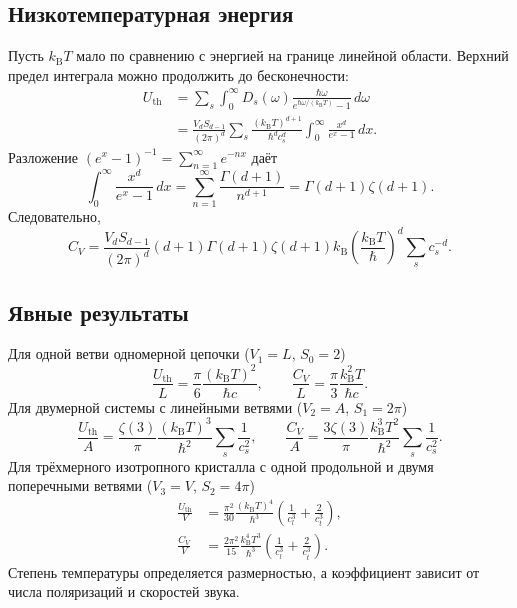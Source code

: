 \documentclass[../final.tex]{subfiles}
\begin{document}
\subsection*{Низкотемпературная энергия}

Пусть $k_{\mathrm B}T$ мало по сравнению с энергией на границе
линейной области. Верхний предел интеграла можно продолжить до бесконечности:
\begin{align*}
    U_{\mathrm{th}}
       &=\sum_s\int_0^\infty D_s(\omega)
          \frac{\hbar\omega}{e^{\hbar\omega/(k_{\mathrm B}T)}-1}\,d\omega\\
       &=\frac{V_d S_{d-1}}{(2\pi)^d}
          \sum_s\frac{(k_{\mathrm B}T)^{d+1}}{\hbar^d c_s^d}
          \int_0^\infty\frac{x^d}{e^x-1}\,dx.
\end{align*}
Разложение $(e^x-1)^{-1}=\sum_{n=1}^\infty e^{-nx}$ даёт
\[
    \int_0^\infty\frac{x^d}{e^x-1}\,dx
       =\sum_{n=1}^\infty\frac{\Gamma(d+1)}{n^{d+1}}
       =\Gamma(d+1)\zeta(d+1).
\]
Следовательно,
\[
    C_V=\frac{V_d S_{d-1}}{(2\pi)^d}(d+1)\Gamma(d+1)\zeta(d+1)
       k_{\mathrm B}\left(\frac{k_{\mathrm B}T}{\hbar}\right)^d
       \sum_s c_s^{-d}.
\]

\subsection*{Явные результаты}

Для одной ветви одномерной цепочки ($V_1=L$, $S_0=2$)
\[
    \frac{U_{\mathrm{th}}}{L}
       =\frac{\pi}{6}\frac{(k_{\mathrm B}T)^2}{\hbar c},
    \qquad
    \frac{C_V}{L}=\frac{\pi}{3}
       \frac{k_{\mathrm B}^2T}{\hbar c}.
\]
Для двумерной системы с линейными ветвями ($V_2=A$, $S_1=2\pi$)
\[
    \frac{U_{\mathrm{th}}}{A}
       =\frac{\zeta(3)}{\pi}
          \frac{(k_{\mathrm B}T)^3}{\hbar^2}\sum_s\frac1{c_s^2},
    \qquad
    \frac{C_V}{A}=\frac{3\zeta(3)}{\pi}
          \frac{k_{\mathrm B}^3T^2}{\hbar^2}\sum_s\frac1{c_s^2}.
\]
Для трёхмерного изотропного кристалла с одной продольной и двумя
поперечными ветвями ($V_3=V$, $S_2=4\pi$)
\begin{align*}
    \frac{U_{\mathrm{th}}}{V}
       &=\frac{\pi^2}{30}\frac{(k_{\mathrm B}T)^4}{\hbar^3}
          \left(\frac1{c_l^3}+\frac2{c_t^3}\right),\\
    \frac{C_V}{V}
       &=\frac{2\pi^2}{15}\frac{k_{\mathrm B}^4T^3}{\hbar^3}
          \left(\frac1{c_l^3}+\frac2{c_t^3}\right).
\end{align*}
Степень температуры определяется размерностью, а коэффициент
зависит от числа поляризаций и скоростей звука.
\end{document}
